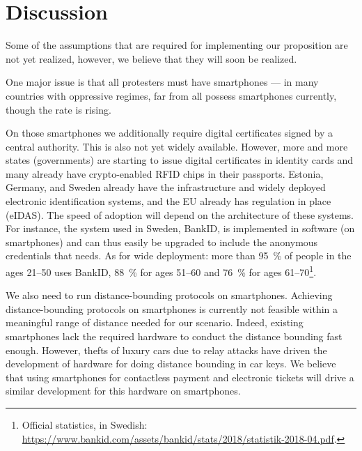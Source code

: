 \section{Discussion}%
\label{Discussion}


Some of the assumptions that are required for implementing our proposition are 
not yet realized, however, we believe that they will soon be realized.

One major issue is that all protesters must have smartphones --- in many 
countries with oppressive regimes, far from all possess smartphones
currently, though the rate is rising.

On those smartphones we additionally require digital certificates signed by a 
central authority.
This is also not yet widely available.
However, more and more states (governments) are starting to issue digital 
certificates in identity cards and many already have crypto-enabled RFID chips 
in their passports.
\Eg Estonia, Germany, and Sweden already have the infrastructure and widely 
deployed electronic identification systems, and the EU already has regulation 
in place (eIDAS).
The speed of adoption will depend on the architecture of these systems.
For instance, the system used in Sweden, BankID, is implemented in software (on 
smartphones) and can thus easily be upgraded to include the anonymous 
credentials that \CROCUS needs.
As for wide deployment: more than \SI{95}{\%} of people in the ages 21--50 uses 
BankID, \SI{88}{\%} for ages 51--60 and \SI{76}{\%} for ages 
61--70\footnote{%
  Official statistics, in Swedish:  
  \url{https://www.bankid.com/assets/bankid/stats/2018/statistik-2018-04.pdf}.
}.

We also need to run distance-bounding protocols on smartphones.
Achieving distance-bounding protocols on smartphones is currently not feasible 
within a meaningful range of distance needed for our scenario.
Indeed, existing smartphones lack the required hardware to conduct the distance bounding fast enough.
However, thefts of luxury cars due to relay attacks have driven the development 
of hardware for doing distance bounding in car keys.
We believe that using smartphones for contactless payment and electronic 
tickets will drive a similar development for this hardware on smartphones.

